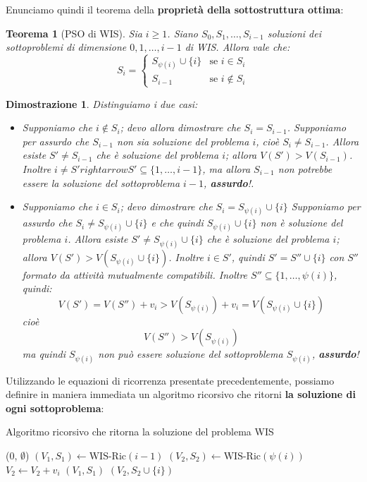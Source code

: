 \documentclass[12pt]{article}
\newtheorem{Teorema}{Teorema}[subsection]
\newtheorem{Dimostrazione}{Dimostrazione}[subsection]
\begin{document}
Enunciamo quindi il teorema della \textbf{proprietà della sottostruttura ottima}:
\begin{Teorema}[PSO di WIS]
    Sia $i \geq 1$. Siano $S_0, S_1, \dots, S_{i-1}$ soluzioni dei sottoproblemi di dimensione $0, 1,\dots,i-1$ di WIS.
    Allora vale che:
    \begin{equation*}
        S_i = \begin{cases}
        S_{\psi(i)} \cup \{i\} & \textrm{se } i \in S_i \\
        S_{i-1} & \textrm{se } i \notin S_i
    \end{cases}
    \end{equation*}
\end{Teorema}
\begin{Dimostrazione}
    Distinguiamo i due casi:
    \begin{itemize}
        \item Supponiamo che $i \notin S_i$; devo allora dimostrare che $S_i = S_{i-1}$.
        Supponiamo per assurdo che $S_{i-1}$ non sia soluzione del problema $i$, cioè $S_i \neq S_{i-1}$.
        Allora esiste $S' \neq S_{i-1}$ che è soluzione del problema $i$; allora $V(S') > V(S_{i-1})$.
        Inoltre $i \neq S' rightarrow S' \subseteq\{1,\dots, i-1\}$, ma allora $S_{i-1}$ non potrebbe essere la soluzione
        del sottoproblema $i-1$, \textbf{assurdo}!.
        \item Supponiamo che $i \in S_i$; devo dimostrare che $S_i = S_{\psi(i)} \cup \{i\}$
        Supponiamo per assurdo che $S_i \neq S_{\psi(i)} \cup \{i\}$ e che quindi $S_{\psi(i)} \cup \{i\}$ non è soluzione del problema $i$.
        Allora esiste $S' \neq S_{\psi(i)} \cup \{i\}$ che è soluzione del problema $i$; allora $V(S') > V(S_{\psi(i)} \cup \{i\})$.
        Inoltre $i \in S'$, quindi $S' = S'' \cup \{i\}$ con $S''$ formato da attività mutualmente compatibili.
        Inoltre $S'' \subseteq \{1,\dots, \psi(i)\}$, quindi:
        $$V(S') = V(S'') + v_i > V(S_{\psi(i)}) + v_i = V(S_{\psi(i)} \cup \{i\})$$
        cioè
        $$V(S'') > V(S_{\psi(i)})$$
        ma quindi $S_{\psi(i)}$ non può essere soluzione del sottoproblema $S_{\psi(i)}$, \textbf{assurdo}!
    \end{itemize}
\end{Dimostrazione}
Utilizzando le equazioni di ricorrenza presentate precedentemente, possiamo definire in maniera immediata un algoritmo ricorsivo che
ritorni \textbf{la soluzione di ogni sottoproblema}: \newline
\begin{algorithm}[H]
    \caption{Algoritmo ricorsivo che ritorna la soluzione del problema WIS}
     {
         {
            \Return (0, $\emptyset$)
        } {
            $(V_1, S_1) \gets \textrm{WIS-Ric}(i-1)$ \;
            $(V_2, S_2) \gets \textrm{WIS-Ric}(\psi(i))$ \;
            $V_2 \gets V_2 + v_i$ \;
             {
                \Return $(V_1, S_1)$
            } {
                \Return $(V_2, S_2 \cup \{i\})$
            }
        }
    }
\end{algorithm} \noindent
\end{document}
